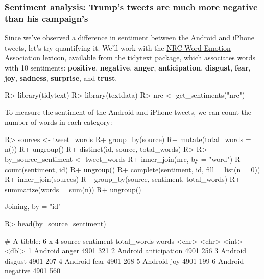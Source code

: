\documentclass[
]{jss}
\begin{document}
\hypertarget{sentiment-analysis-trumps-tweets-are-much-more-negative-than-his-campaigns}{%
\subsubsection{Sentiment analysis: Trump's tweets are much more negative
than his
campaign's}\label{sentiment-analysis-trumps-tweets-are-much-more-negative-than-his-campaigns}}

Since we've observed a difference in sentiment between the Android and
iPhone tweets, let's try quantifying it. We'll work with the
\href{http://saifmohammad.com/WebPages/NRC-Emotion-Lexicon.htm}{NRC
Word-Emotion Association} lexicon, available from the tidytext package,
which associates words with 10 sentiments: \textbf{positive},
\textbf{negative}, \textbf{anger}, \textbf{anticipation},
\textbf{disgust}, \textbf{fear}, \textbf{joy}, \textbf{sadness},
\textbf{surprise}, and \textbf{trust}.

\begin{CodeChunk}

\begin{CodeInput}
R> library(tidytext)
R> library(textdata)
R> nrc <- get_sentiments("nrc")
\end{CodeInput}
\end{CodeChunk}

To measure the sentiment of the Android and iPhone tweets, we can count
the number of words in each category:

\begin{CodeChunk}

\begin{CodeInput}
R> sources <- tweet_words %
R+   group_by(source) %
R+   mutate(total_words = n()) %
R+   ungroup() %
R+   distinct(id, source, total_words)
R> 
R> by_source_sentiment <- tweet_words %
R+   inner_join(nrc, by = "word") %
R+   count(sentiment, id) %
R+   ungroup() %
R+   complete(sentiment, id, fill = list(n = 0)) %
R+   inner_join(sources) %
R+   group_by(source, sentiment, total_words) %
R+   summarize(words = sum(n)) %
R+   ungroup()
\end{CodeInput}

\begin{CodeOutput}
Joining, by = "id"
\end{CodeOutput}

\begin{CodeInput}
R> head(by_source_sentiment)
\end{CodeInput}

\begin{CodeOutput}
# A tibble: 6 x 4
  source  sentiment    total_words words
  <chr>   <chr>              <int> <dbl>
1 Android anger               4901   321
2 Android anticipation        4901   256
3 Android disgust             4901   207
4 Android fear                4901   268
5 Android joy                 4901   199
6 Android negative            4901   560
\end{CodeOutput}
\end{CodeChunk}
\end{document}
